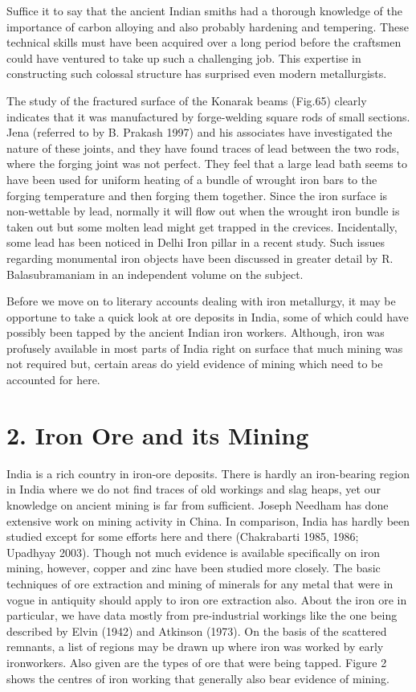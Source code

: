 Suffice it to say that the ancient Indian smiths had a thorough knowledge of the importance of carbon alloying and also probably hardening and tempering. These technical skills must have been acquired over a long period before the craftsmen could have ventured to take up such a challenging job. This expertise in constructing such colossal structure has surprised even modern metallurgists.

The study of the fractured surface of the Konarak beams (Fig.65) clearly indicates that it was manufactured by forge-welding square rods of small sections. Jena (referred to by B. Prakash 1997) and his associates have investigated the nature of these joints, and they have found traces of lead between the two rods, where the forging joint was not perfect. They feel that a large lead bath seems to have been used for uniform heating of a bundle of wrought iron bars to the forging temperature and then forging them together. Since the iron surface is non-wettable by lead, normally it will flow out when the wrought iron bundle is taken out but some molten lead might get trapped in the crevices. Incidentally, some lead has been noticed in Delhi Iron pillar in a recent study. Such issues regarding monumental iron objects have been discussed in greater detail by R. Balasubramaniam in an independent volume on the subject.

Before we move on to literary accounts dealing with iron metallurgy, it may be opportune to take a quick look at ore deposits in India, some of which could have possibly been tapped by the ancient Indian iron workers. Although, iron was profusely available in most parts of India right on surface that much mining was not required but, certain areas do yield evidence of mining which need to be accounted for here.


\section*{2. Iron Ore and its Mining}

India is a rich country in iron-ore deposits. There is hardly an iron-bearing region in India where we do not find traces of old workings and slag heaps, yet our knowledge on ancient mining is far from sufficient. Joseph Needham has done extensive work on mining activity in China. In comparison, India has hardly been studied except for some efforts here and there (Chakrabarti 1985, 1986; Upadhyay 2003). Though not much evidence is available specifically on iron mining, however, copper and zinc have been studied more closely. The basic techniques of ore extraction and mining of minerals for any metal that were in vogue in antiquity should apply to iron ore extraction also. About the iron ore in particular, we have data mostly from pre-industrial workings like the one being described by Elvin (1942) and Atkinson (1973). On the basis of the scattered remnants, a list of regions may be drawn up where iron was worked by early ironworkers. Also given are the types of ore that were being tapped. Figure 2 shows the centres of iron working that generally also bear evidence of mining.

